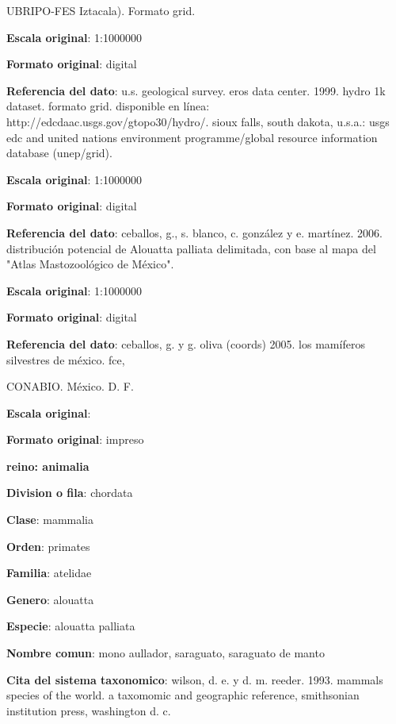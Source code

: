 \documentclass[twoside]{book}
\begin{document}
{UBRIPO-FES Iztacala). Formato grid.

\textbf{Escala original}: 1:1000000

\textbf{Formato original}: digital

\textbf{Referencia del dato}: u.s. geological survey. eros data center. 1999. hydro 1k dataset. formato grid. disponible en línea: http://edcdaac.usgs.gov/gtopo30/hydro/. sioux falls, south dakota, u.s.a.: usgs edc and united nations environment programme/global resource information database (unep/grid).

\textbf{Escala original}: 1:1000000

\textbf{Formato original}: digital

\textbf{Referencia del dato}: ceballos, g., s. blanco, c. gonzález y e. martínez. 2006. distribución
potencial de Alouatta palliata delimitada, con base al mapa del "Atlas Mastozoológico de México".

\textbf{Escala original}: 1:1000000

\textbf{Formato original}: digital

\textbf{Referencia del dato}: ceballos, g. y g. oliva (coords) 2005. los mamíferos silvestres de méxico. fce,

CONABIO. México. D. F.

\textbf{Escala original}:

\textbf{Formato original}: impreso


\textbf{reino: animalia}

\textbf{Division o fila}: chordata

\textbf{Clase}: mammalia

\textbf{Orden}: primates

\textbf{Familia}: atelidae

\textbf{Genero}: alouatta

\textbf{Especie}: alouatta palliata

\textbf{Nombre comun}: mono aullador, saraguato, saraguato de manto

\textbf{Cita del sistema taxonomico}: wilson, d. e. y d. m. reeder. 1993. mammals species of the world. a taxomomic and geographic reference, smithsonian institution press, washington d. c.

}
\end{document}
